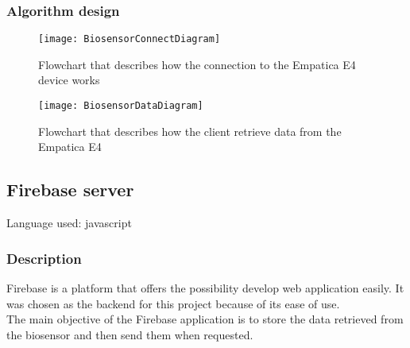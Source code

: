\subsubsection{Algorithm design}
\begin{figure}[H]
	\centering
	\texttt{[image: BiosensorConnectDiagram]}
	\caption{Flowchart that describes how the connection to the Empatica E4 device works}
\end{figure}

\begin{figure}[H]
	\centering
	\texttt{[image: BiosensorDataDiagram]}
	\caption{Flowchart that describes how the client retrieve data from the Empatica E4}
\end{figure}
\pagebreak

\subsection{Firebase server}
Language used: javascript

\subsubsection{Description}
Firebase is a platform that offers the possibility develop web application easily. It was chosen as the backend for this project because of its ease of use.\\
The main objective of the Firebase application is to store the data retrieved from the biosensor and then send them when requested.


